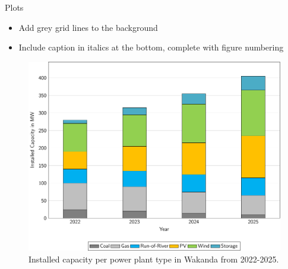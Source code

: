 \documentclass[aspectratio=169]{beamer}
\begin{document}
\begin{frame}{Plots}
\begin{minipage}[t]{0.49\textwidth}
\begin{coloredblock}
                \begin{itemize}
                    \item \footnotesize Add grey grid lines to the background
                    \item \footnotesize Include caption in italics at the bottom, complete with figure numbering
                \end{itemize}
        \end{coloredblock}
    \end{minipage}
    \hfill
    \begin{minipage}[t]{0.49\textwidth}
        \vspace{1cm}
        \tiny
        \begin{overprint}
            \begin{figure}[htbp]
                \includegraphics[width=\linewidth]{figures/installed_capacity_2022-2025.pdf}
                \caption{\centering Installed capacity per power plant type in Wakanda from 2022-2025.}
                \label{fig:installed_capacity}
        \end{figure}


\end{overprint}
\end{minipage}
\end{frame}
\end{document}
